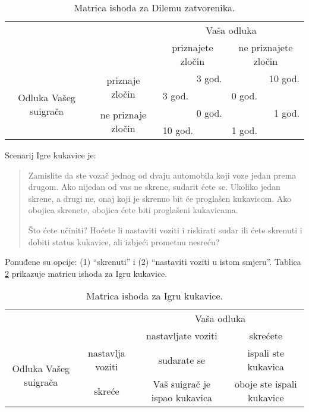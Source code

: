 \documentclass[a4paper, 12pt]{report}
\begin{document}
\begin{appendices}
\begin{table}[!h]
    \centering
    \caption{Matrica ishoda za Dilemu zatvorenika. \label{pdtab}}
\begin{tabular}{cccc}
\toprule[1pt]
    & & \multicolumn{2}{c}{\textcolor{plava}{Vaša odluka}}\\
    \cmidrule[0.5pt]{3-4}
        & & priznajete zločin & ne priznajete zločin\\
        \multirow{4}{*}{\textcolor{zelena}{Odluka Vašeg suigrača}} & \multirow{2}{*}{priznaje
        zločin} & \multicolumn{1}{r}{\textcolor{plava}{3 god.}} &
    \multicolumn{1}{r}{\textcolor{plava}{10 god.}}\\
                 & & \multicolumn{1}{l}{\textcolor{zelena}{3 god.}} &
                 \multicolumn{1}{l}{\textcolor{zelena}{0 god.}}\\
        \cmidrule[0.5pt]{2-4}
        & \multirow{2}{*}{ne priznaje zločin} &
        \multicolumn{1}{r}{\textcolor{plava}{0 god.}} &
        \multicolumn{1}{r}{\textcolor{plava}{1 god.}}\\
        & & \multicolumn{1}{l}{\textcolor{zelena}{10 god.}} &
        \multicolumn{1}{l}{\textcolor{zelena}{1 god.}}\\
	\bottomrule[1pt]
\end{tabular}
\end{table}

Scenarij Igre kukavice je: 
\begin{quote}
Zamislite da ste vozač jednog od dvaju automobila koji voze jedan prema drugom.
Ako nijedan od vas ne skrene, sudarit ćete se. Ukoliko jedan skrene, a drugi ne,
onaj koji je skrenuo bit će proglašen kukavicom. Ako obojica skrenete, obojica
ćete biti proglašeni kukavicama.

Što ćete učiniti? Hoćete li nastaviti voziti i riskirati sudar ili ćete skrenuti
i dobiti status kukavice, ali izbjeći prometnu nesreću?
\end{quote}

Ponuđene su opcije: (1) \enquote{skrenuti} i (2) \enquote{nastaviti voziti u
    istom smjeru}. Tablica \ref{iktab} prikazuje matricu ishoda
za Igru kukavice. 

\begin{table}[h!]
\centering 
    \caption{Matrica ishoda za Igru kukavice. \label{iktab}}
\hspace*{-0.5cm}\begin{tabular}{cccc}
\toprule[1pt]
    & & \multicolumn{2}{c}{Vaša odluka}\\
        & & nastavljate voziti & skrećete\\
    \cmidrule[0.5pt]{3-4}
        \multirow{2}{*}{Odluka Vašeg suigrača} & nastavlja
            voziti & sudarate se & ispali ste kukavica  \\
        & skreće & Vaš suigrač je ispao kukavica & oboje ste
        ispali kukavice\\
	\bottomrule[1pt]
\end{tabular}
\end{table}


\end{appendices}
\end{document}
